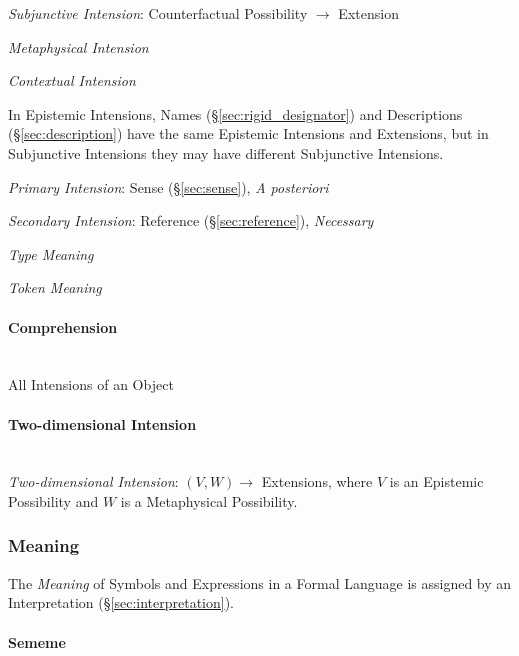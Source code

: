 \emph{Subjunctive Intension}: Counterfactual Possibility $\rightarrow$
Extension

\emph{Metaphysical Intension} %

\emph{Contextual Intension}

In Epistemic Intensions, Names (\S\ref{sec:rigid_designator}) and
Descriptions (\S\ref{sec:description}) have the same Epistemic
Intensions and Extensions, but in Subjunctive Intensions they may have
different Subjunctive Intensions.

\emph{Primary Intension}: Sense (\S\ref{sec:sense}), \emph{A
  posteriori}

\emph{Secondary Intension}: Reference (\S\ref{sec:reference}),
\emph{Necessary}

\emph{Type Meaning}

\emph{Token Meaning}



\paragraph{Comprehension}\label{sec:comprehension}
\hfill \\

All Intensions of an Object



\paragraph{Two-dimensional Intension}\label{sec:twodimensional_intension}
\hfill \\

\emph{Two-dimensional Intension}: $(V,W) \rightarrow$ Extensions,
where $V$ is an Epistemic Possibility and $W$ is a Metaphysical
Possibility.



\subsubsection{Meaning}\label{sec:meaning}

The \emph{Meaning} of Symbols and Expressions in a Formal Language is
assigned by an Interpretation (\S\ref{sec:interpretation}).



\paragraph{Sememe}\label{sec:sememe}
\hfill \\

